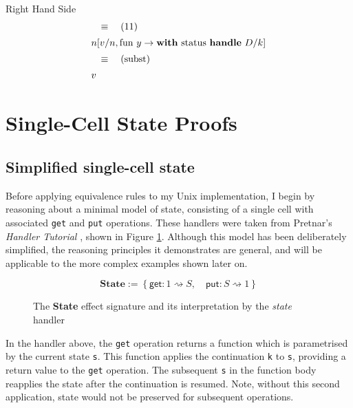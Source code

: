 \documentclass[logo,bsc,singlespacing,parskip]{infthesis}
\begin{document}
{Right Hand Side}
\vspace{-0.2em}
\[
\begin{array}{l}
\quad\equiv\quad (11) \\[5pt]
n [v/n, \text{fun } y \rightarrow \text{\textbf{with} status \textbf{handle} } D/k] \\[5pt]
\quad\equiv\quad (\text{subst}) \\[5pt]
v
\end{array}
\]





\section{Single-Cell State Proofs}

\subsection{Simplified single-cell state}

\label{subsec:simplified-state}
Before applying equivalence rules to my Unix implementation, I begin by reasoning about a minimal model of state, consisting of a single cell with associated \lstinline{get} and \lstinline{put} operations. These handlers were taken from Pretnar's \textit{Handler Tutorial} \cite{pretnar_introduction_2015}, shown in Figure \ref{fig:state-handler}. Although this model has been deliberately simplified, the reasoning principles it demonstrates are general, and will be applicable to the more complex examples shown later on.  

\begin{figure}
   
\[
\textbf{State} := \left\{
\mathsf{get} : 1 \rightsquigarrow S, \quad
\mathsf{put} : S \rightsquigarrow 1
\right\}
\]


\caption{The \textbf{State} effect signature and its interpretation by the \textit{state} handler}
\label{fig:state-handler}
\end{figure}

In the handler above, the \lstinline{get} operation returns a function which is parametrised by the current state \lstinline{s}. This function applies the continuation \lstinline{k}  to \lstinline{s}, providing a return value to the \lstinline{get} operation. The subsequent \lstinline{s} in the function body reapplies the state after the continuation is resumed. Note, without this second application, state would not be preserved for subsequent operations. 
\end{document}
